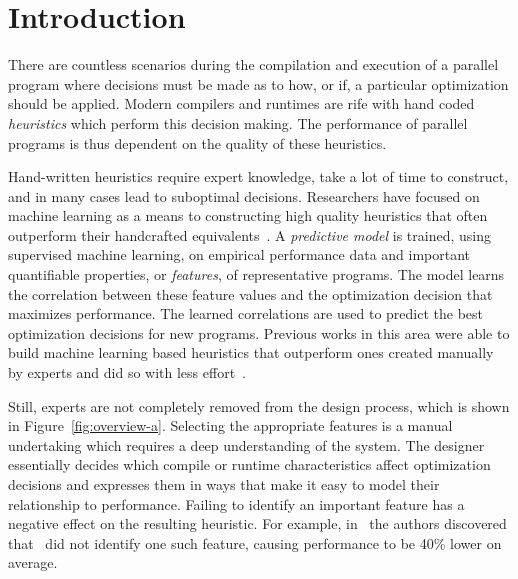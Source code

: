 \section{Introduction}

There are countless scenarios during the compilation and execution of a parallel program where decisions must be made as to how, or if, a particular optimization should be applied. Modern compilers and runtimes are rife with hand coded \emph{heuristics} which perform this decision making. The performance of parallel programs is thus dependent on the quality of these heuristics.

Hand-written heuristics require expert knowledge, take a lot of time to construct, and in many cases lead to suboptimal decisions. Researchers have focused on machine learning as a means to constructing high quality heuristics that often outperform their handcrafted equivalents~\cite{Micolet2016,Falch2015,Stephenson2005,Agakov}. %
A \emph{predictive model} is trained, using supervised machine learning, on empirical performance data and important quantifiable properties, or \emph{features}, of representative programs.
The model learns the correlation between these feature values and the optimization decision that maximizes performance. The learned correlations are used to predict the best optimization decisions for new programs. Previous works in this area were able to build machine learning based heuristics that outperform ones created manually by experts and did so with less effort~\cite{Grewe2013,Magni2014}.

Still, experts are not completely removed from the design process, which is shown in Figure~\ref{fig:overview-a}. Selecting the appropriate features is a manual undertaking which requires a deep understanding of the system. The designer essentially decides which compile or runtime characteristics affect optimization decisions and expresses them in ways that make it easy to model their relationship to performance. Failing to identify an important feature has a negative effect on the resulting heuristic. For example, in~\cite{Cummins2017a} the authors discovered that~\cite{Grewe2013} did not identify one such feature, causing performance to be 40\% lower on average.

